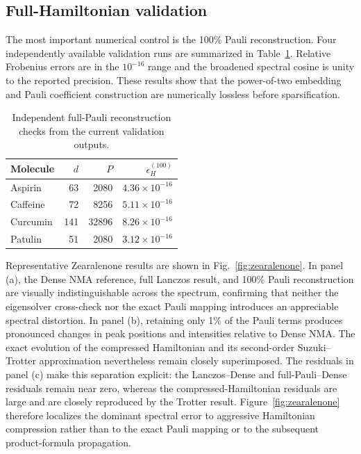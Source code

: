 \documentclass[aip,jcp,reprint,amsmath,amssymb,floatfix]{revtex4-2}
\begin{document}
\subsection{Full-Hamiltonian validation}
The most important numerical control is the 100\% Pauli reconstruction. Four independently available validation runs are summarized in Table~\ref{tab:paulival}. Relative Frobenius errors are in the $10^{-16}$ range and the broadened spectral cosine is unity to the reported precision. These results show that the power-of-two embedding and Pauli coefficient construction are numerically lossless before sparsification.

\begin{table}[b]
\caption{Independent full-Pauli reconstruction checks from the current validation outputs.}
\label{tab:paulival}
\centering
\scriptsize
\begin{tabular}{lrrr}
\toprule
Molecule & $d$ & $P$ & $\epsilon_H^{(100)}$\\
\midrule
Aspirin  & 63  & 2080  & $4.36\times10^{-16}$\\
Caffeine & 72  & 8256  & $5.11\times10^{-16}$\\
Curcumin & 141 & 32896 & $8.26\times10^{-16}$\\
Patulin  & 51  & 2080  & $3.12\times10^{-16}$\\
\bottomrule
\end{tabular}
\end{table}

Representative Zearalenone results are shown in Fig.~\ref{fig:zearalenone}. In panel (a), the Dense NMA reference, full Lanczos result, and 100\% Pauli reconstruction are visually indistinguishable across the spectrum, confirming that neither the eigensolver cross-check nor the exact Pauli mapping introduces an appreciable spectral distortion. In panel (b), retaining only 1\% of the Pauli terms produces pronounced changes in peak positions and intensities relative to Dense NMA. The exact evolution of the compressed Hamiltonian and its second-order Suzuki--Trotter approximation nevertheless remain closely superimposed. The residuals in panel (c) make this separation explicit: the Lanczos--Dense and full-Pauli--Dense residuals remain near zero, whereas the compressed-Hamiltonian residuals are large and are closely reproduced by the Trotter result. Figure~\ref{fig:zearalenone} therefore localizes the dominant spectral error to aggressive Hamiltonian compression rather than to the exact Pauli mapping or to the subsequent product-formula propagation.
\end{document}
